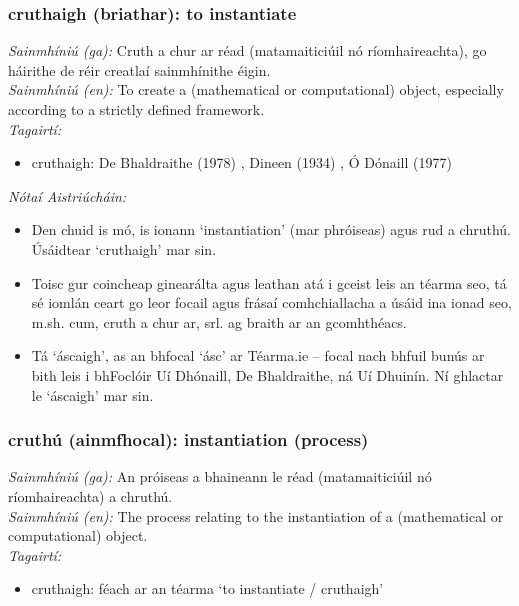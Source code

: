 \subsubsection*{cruthaigh (briathar): to instantiate}
 \noindent \textit{Sainmhíniú (ga):} Cruth a chur ar réad (matamaiticiúil nó ríomhaireachta), go háirithe de réir creatlaí sainmhínithe éigin.
\\
 \noindent \textit{Sainmhíniú (en):} To create a (mathematical or computational) object, especially according to a strictly defined framework.
\\
 \noindent \textit{Tagairtí:}
\begin{itemize}
	\item cruthaigh: De Bhaldraithe (1978) \cite{de-bhaldraithe}, Dineen (1934) \cite{dineen}, Ó Dónaill (1977) \cite{odonaill}
\end{itemize}

 \noindent \textit{Nótaí Aistriúcháin:}
\begin{itemize}
	\item Den chuid is mó, is ionann `instantiation' (mar phróiseas) agus rud a chruthú. Úsáidtear `cruthaigh' mar sin.
	\item Toisc gur coincheap ginearálta agus leathan atá i gceist leis an téarma seo, tá sé iomlán ceart go leor focail agus frásaí comhchiallacha a úsáid ina ionad seo, m.sh. cum, cruth a chur ar, srl. ag braith ar an gcomhthéacs.
	\item Tá `áscaigh', as an  bhfocal `ásc' ar Téarma.ie -- focal nach bhfuil bunús ar bith leis i bhFoclóir Uí Dhónaill, De Bhaldraithe, ná Uí Dhuinín. Ní ghlactar le `áscaigh' mar sin.
\end{itemize}


\subsubsection*{cruthú (ainmfhocal): instantiation (process)}
 \noindent \textit{Sainmhíniú (ga):} An próiseas a bhaineann le réad (matamaiticiúil nó ríomhaireachta) a chruthú.
\\
 \noindent \textit{Sainmhíniú (en):} The process relating to the instantiation of a (mathematical or computational) object.
\\
 \noindent \textit{Tagairtí:}
\begin{itemize}
	\item cruthaigh: féach ar an téarma `to instantiate / cruthaigh'
\end{itemize}

